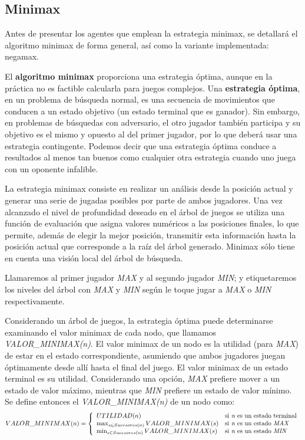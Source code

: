 \subsection{Minimax}
\label{ssec:minimax}
Antes de presentar los agentes que emplean la estrategia minimax, se detallará el algoritmo minimax de forma general, así como la variante implementada: negamax.

\bigskip
El \textbf{algoritmo minimax} proporciona una estrategia óptima, aunque en la práctica no es factible calcularla para juegos complejos.
Una \textbf{estrategia óptima}, en un problema de búsqueda normal, es una secuencia de movimientos que conducen a un estado objetivo (un estado terminal que es ganador).
Sin embargo, en problemas de búsquedas con adversario, el otro jugador también participa y su objetivo es el mismo y opuesto al del primer jugador, por lo que deberá usar una estrategia contingente.
Podemos decir que una estrategia óptima conduce a resultados al menos tan buenos como cualquier otra estrategia cuando uno juega con un oponente infalible.

La estrategia minimax consiste en realizar un análisis desde la posición actual y generar una serie de jugadas posibles por parte de ambos jugadores.
Una vez alcanzado el nivel de profundidad deseado en el árbol de juegos se utiliza una función de evaluación que asigna valores numéricos a las posiciones finales, lo que permite, además de elegir la mejor posición, transmitir esta información hasta la posición actual que corresponde a la raíz del árbol generado. 
Minimax sólo tiene en cuenta una visión local del árbol de búsqueda.

Llamaremos al primer jugador \textit{MAX} y al segundo jugador \textit{MIN}; y etiquetaremos los niveles del árbol con \textit{MAX} y \textit{MIN} según le toque jugar a \textit{MAX} o \textit{MIN} respectivamente.

Considerando un árbol de juegos, la estrategia óptima puede determinarse examinando el valor minimax de cada nodo, que llamamos \textit{VALOR\_MINIMAX(n)}.
El valor minimax de un nodo es la utilidad (para \textit{MAX}) de estar en el estado correspondiente, asumiendo que ambos jugadores juegan óptimamente desde allí hasta el final del juego.
El valor minimax de un estado terminal es su utilidad.
Considerando una opción, \textit{MAX} prefiere mover a un estado de valor máximo, mientras que \textit{MIN} prefiere un estado de valor mínimo. 
Se define entonces el \textit{VALOR\_MINIMAX(n)} de un nodo como:
{\footnotesize
\begin{equation}
VALOR\_MINIMAX(n) = 
\left\{\begin{array}{ll}
UTILIDAD(n) & \textnormal{si \textit{n} es un estado terminal}\\
\max_{s\in Sucesores(n)} VALOR\_MINIMAX(s) & \textnormal{si \textit{n} es un estado \textit{MAX}}\\
\min_{s\in Sucesores(n)} VALOR\_MINIMAX(s) & \textnormal{si \textit{n} es un estado \textit{MIN}}\\
\end{array}\right. \label{eq:minimax}
\end{equation}
}


